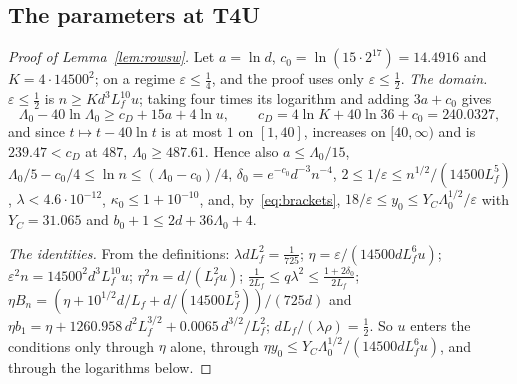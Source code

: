 \documentclass[11pt]{amsart}
\theoremstyle{definition}
\numberwithin{equation}{section}
\begin{document}
\subsection*{The parameters at T4U}

\begin{proof}[Proof of Lemma~\ref{lem:rowsw}]
Let $a=\ln d$, $c_0=\ln(15\cdot2^{17})=14.4916$ and $K=4\cdot14500^2$; on a regime $\varepsilon\le\frac14$, and the proof uses only $\varepsilon\le\frac12$. \emph{The domain.} $\varepsilon\le\frac12$ is $n\ge Kd^3L_f^{10}u$; taking four times its logarithm and adding $3a+c_0$ gives
\[
\Lambda_0-40\ln\Lambda_0\ge c_D+15a+4\ln u,\qquad c_D=4\ln K+40\ln36+c_0=240.0327,
\]
and since $t\mapsto t-40\ln t$ is at most $1$ on $[1,40]$, increases on $[40,\infty)$ and is $239.47<c_D$ at $487$, $\Lambda_0\ge487.61$. Hence also $a\le\Lambda_0/15$, $\Lambda_0/5-c_0/4\le\ln n\le(\Lambda_0-c_0)/4$, $\delta_0=e^{-c_0}d^{-3}n^{-4}$, $2\le1/\varepsilon\le n^{1/2}/(14500L_f^5)$, $\lambda<4.6\cdot10^{-12}$, $\kappa_0\le1+10^{-10}$, and, by~\eqref{eq:brackets}, $18/\varepsilon\le y_0\le Y_C\Lambda_0^{1/2}/\varepsilon$ with $Y_C=31.065$ and $b_0+1\le2d+36\Lambda_0+4$.

\emph{The identities.} From the definitions: $\lambda dL_f^2=\frac1{725}$; $\eta=\varepsilon/(14500dL_f^6u)$; $\varepsilon^2n=14500^2d^3L_f^{10}u$; $\eta^2n=d/(L_f^2u)$; $\frac1{2L_f}\le q\lambda^2\le\frac{1+2\delta_0}{2L_f}$; $\eta B_n=(\eta+10^{1/2}d/L_f+d/(14500L_f^5))/(725d)$ and $\eta b_1=\eta+1260.958\,d^2L_f^{3/2}+0.0065\,d^{3/2}/L_f^2$; $dL_f/(\lambda\rho)=\frac12$. So $u$ enters the conditions only through $\eta$ alone, through $\eta y_0\le Y_C\Lambda_0^{1/2}/(14500dL_f^6u)$, and through the logarithms below.


\end{proof}
\end{document}

